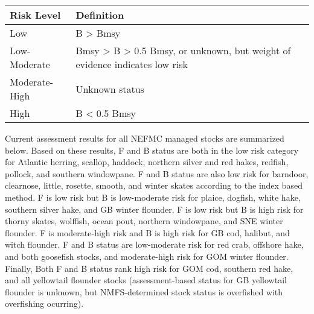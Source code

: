 \documentclass[11pt,]{article}
\begin{document}
\begin{longtable}[]{@{}ll@{}}
\toprule
\begin{minipage}[b]{0.22\columnwidth}\raggedright\strut
Risk Level\strut
\end{minipage} & \begin{minipage}[b]{0.72\columnwidth}\raggedright\strut
Definition\strut
\end{minipage}\tabularnewline
\midrule
\endhead
\begin{minipage}[t]{0.22\columnwidth}\raggedright\strut
Low\strut
\end{minipage} & \begin{minipage}[t]{0.72\columnwidth}\raggedright\strut
B \textgreater{} Bmsy\strut
\end{minipage}\tabularnewline
\begin{minipage}[t]{0.22\columnwidth}\raggedright\strut
Low-Moderate\strut
\end{minipage} & \begin{minipage}[t]{0.72\columnwidth}\raggedright\strut
Bmsy \textgreater{} B \textgreater{} 0.5 Bmsy, or unknown, but weight of
evidence indicates low risk\strut
\end{minipage}\tabularnewline
\begin{minipage}[t]{0.22\columnwidth}\raggedright\strut
Moderate-High\strut
\end{minipage} & \begin{minipage}[t]{0.72\columnwidth}\raggedright\strut
Unknown status\strut
\end{minipage}\tabularnewline
\begin{minipage}[t]{0.22\columnwidth}\raggedright\strut
High\strut
\end{minipage} & \begin{minipage}[t]{0.72\columnwidth}\raggedright\strut
B \textless{} 0.5 Bmsy\strut
\end{minipage}\tabularnewline
\bottomrule
\end{longtable}

Current assessment results for all NEFMC managed stocks are summarized
below. Based on these results, F and B status are both in the low risk
category for Atlantic herring, scallop, haddock, northern silver and red
hakes, redfish, pollock, and southern windowpane. F and B status are
also low risk for barndoor, clearnose, little, rosette, smooth, and
winter skates according to the index based method. F is low risk but B
is low-moderate risk for plaice, dogfish, white hake, southern silver
hake, and GB winter flounder. F is low risk but B is high risk for
thorny skates, wolffish, ocean pout, northern windowpane, and SNE winter
flounder. F is moderate-high risk and B is high risk for GB cod,
halibut, and witch flounder. F and B status are low-moderate risk for
red crab, offshore hake, and both goosefish stocks, and moderate-high
risk for GOM winter flounder. Finally, Both F and B status rank high
risk for GOM cod, southern red hake, and all yellowtail flounder stocks
(assessment-based status for GB yellowtail flounder is unknown, but
NMFS-determined stock status is overfished with overfishing ocurring).
\end{document}
